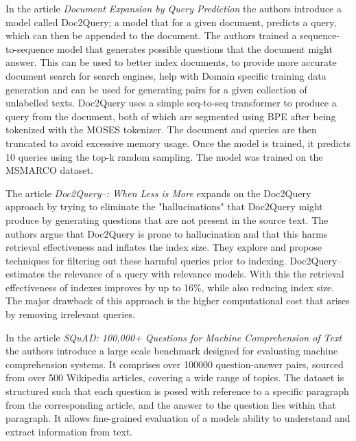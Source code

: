 \documentclass[fleqn,moreauthors,10pt]{ds_report}
\begin{document}
In the article \textit{Document Expansion by Query Prediction}\cite{DBLP:journals/corr/abs-1904-08375} the authors introduce a model called Doc2Query; a model that for a given document, predicts a query, which can then be appended to the document. The authors trained a sequence-to-sequence model that generates possible questions that the document might answer. This can be used to better index documents, to provide more accurate document search for search engines, help with Domain specific training data generation and can be used for generating pairs for a given collection of unlabelled texts. Doc2Query uses a simple seq-to-seq transformer to produce a query from the document, both of which are segmented using BPE\cite{sennrich2016neural} after being tokenized with the MOSES tokenizer. The document and queries are then truncated to avoid excessive memory usage. Once the model is trained, it predicts 10 queries using the top-k random sampling. The model was trained on the MSMARCO\cite{DBLP:journals/corr/NguyenRSGTMD16} dataset.

The article \textit{Doc2Query--: When Less is More}\cite{gospodinov2023doc2query} expands on the Doc2Query approach by trying to eliminate the "hallucinations" that Doc2Query might produce by generating questions that are not present in the source text. The authors argue that Doc2Query is prone to hallucination and that this harms retrieval effectiveness and inflates the index size. They explore and propose techniques for filtering out these harmful queries prior to indexing. Doc2Query-- estimates the relevance of a query with relevance models. With this the retrieval effectiveness of indexes improves by up to 16\%, while also reducing index size. The major drawback of this approach is the higher computational cost that arises by removing irrelevant queries.


In the article \textit{SQuAD: 100,000+ Questions for Machine Comprehension of Text}\cite{DBLP:journals/corr/RajpurkarZLL16} the authors introduce a large scale benchmark designed for evaluating machine comprehension systems. It comprises over 100000 question-answer pairs, sourced from over 500 Wikipedia articles, covering a wide range of topics. The dataset is structured such that each question is posed with reference to a specific paragraph from the corresponding article, and the answer to the question lies within that paragraph. It allows fine-grained evaluation of a models ability to understand and extract information from text.
\end{document}
